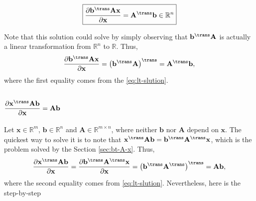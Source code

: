 \begin{align}
    \boxed{\dfrac{\partial \mathbf{b}^\trans \mathbf{A} \mathbf{x}}{\partial \mathbf{x}} = \mathbf{A}^\trans \mathbf{b} \in \mathbb{R}^{n}}
\end{align}

Note that this solution could solve by simply observing that \(\mathbf{\mathbf{b}^\trans \mathbf{A}}\) is actually a linear transformation from \(\mathbb{R}^{n}\) to \(\mathbb{R}\). Thus,
\begin{align}
    \dfrac{\partial \mathbf{b}^\trans \mathbf{A} \mathbf{x}}{\partial \mathbf{x}} = \left( \mathbf{b}^\trans \mathbf{A} \right)^{\trans} = \mathbf{A}^\trans \mathbf{b},
\end{align}
where the first equality comes from the \eqref{eq:lt-slution}.

\subsection{\(\dfrac{\partial \mathbf{x}^\trans \mathbf{A} \mathbf{b}}{\partial \mathbf{x}} = \mathbf{Ab}\)}
Let \(\mathbf{x} \in \mathbb{R}^{m}\), \(\mathbf{b} \in \mathbb{R}^{n}\) and \(\mathbf{A}\in \mathbb{R}^{m\times n}\), where neither \(\mathbf{b}\) nor \(\mathbf{A}\) depend on \(\mathbf{x}\). The quickest way to solve it is to note that \(\mathbf{x}^\trans \mathbf{A} \mathbf{b} =  \mathbf{b}^\trans \mathbf{A}^\trans \mathbf{x}\), which is the problem solved by the Section \ref{sec:bt-A-x}. Thus,
\begin{align}
    \dfrac{\partial \mathbf{x}^\trans \mathbf{A} \mathbf{b}}{\partial \mathbf{x}} = \dfrac{\partial \mathbf{b}^\trans \mathbf{A}^\trans \mathbf{x}}{\partial \mathbf{x}} = \left( \mathbf{b}^\trans \mathbf{A}^\trans \right)^{\trans} = \mathbf{A} \mathbf{b},
\end{align}
where the second equality comes from \eqref{eq:lt-slution}. Nevertheless, here is the step-by-step
